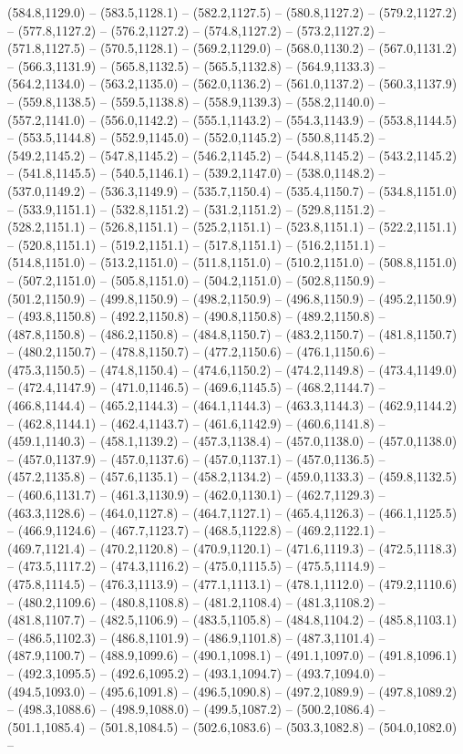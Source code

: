 (584.8,1129.0) -- (583.5,1128.1) -- (582.2,1127.5) -- (580.8,1127.2) -- (579.2,1127.2) -- (577.8,1127.2) -- (576.2,1127.2) -- (574.8,1127.2) -- (573.2,1127.2) -- (571.8,1127.5) -- (570.5,1128.1) -- (569.2,1129.0) -- (568.0,1130.2) -- (567.0,1131.2) -- (566.3,1131.9) -- (565.8,1132.5) -- (565.5,1132.8) -- (564.9,1133.3) -- (564.2,1134.0) -- (563.2,1135.0) -- (562.0,1136.2) -- (561.0,1137.2) -- (560.3,1137.9) -- (559.8,1138.5) -- (559.5,1138.8) -- (558.9,1139.3) -- (558.2,1140.0) -- (557.2,1141.0) -- (556.0,1142.2) -- (555.1,1143.2) -- (554.3,1143.9) -- (553.8,1144.5) -- (553.5,1144.8) -- (552.9,1145.0) -- (552.0,1145.2) -- (550.8,1145.2) -- (549.2,1145.2) -- (547.8,1145.2) -- (546.2,1145.2) -- (544.8,1145.2) -- (543.2,1145.2) -- (541.8,1145.5) -- (540.5,1146.1) -- (539.2,1147.0) -- (538.0,1148.2) -- (537.0,1149.2) -- (536.3,1149.9) -- (535.7,1150.4) -- (535.4,1150.7) -- (534.8,1151.0) -- (533.9,1151.1) -- (532.8,1151.2) -- (531.2,1151.2) -- (529.8,1151.2) -- (528.2,1151.1) -- (526.8,1151.1) -- (525.2,1151.1) -- (523.8,1151.1) -- (522.2,1151.1) -- (520.8,1151.1) -- (519.2,1151.1) -- (517.8,1151.1) -- (516.2,1151.1) -- (514.8,1151.0) -- (513.2,1151.0) -- (511.8,1151.0) -- (510.2,1151.0) -- (508.8,1151.0) -- (507.2,1151.0) -- (505.8,1151.0) -- (504.2,1151.0) -- (502.8,1150.9) -- (501.2,1150.9) -- (499.8,1150.9) -- (498.2,1150.9) -- (496.8,1150.9) -- (495.2,1150.9) -- (493.8,1150.8) -- (492.2,1150.8) -- (490.8,1150.8) -- (489.2,1150.8) -- (487.8,1150.8) -- (486.2,1150.8) -- (484.8,1150.7) -- (483.2,1150.7) -- (481.8,1150.7) -- (480.2,1150.7) -- (478.8,1150.7) -- (477.2,1150.6) -- (476.1,1150.6) -- (475.3,1150.5) -- (474.8,1150.4) -- (474.6,1150.2) -- (474.2,1149.8) -- (473.4,1149.0) -- (472.4,1147.9) -- (471.0,1146.5) -- (469.6,1145.5) -- (468.2,1144.7) -- (466.8,1144.4) -- (465.2,1144.3) -- (464.1,1144.3) -- (463.3,1144.3) -- (462.9,1144.2) -- (462.8,1144.1) -- (462.4,1143.7) -- (461.6,1142.9) -- (460.6,1141.8) -- (459.1,1140.3) -- (458.1,1139.2) -- (457.3,1138.4) -- (457.0,1138.0) -- (457.0,1138.0) -- (457.0,1137.9) -- (457.0,1137.6) -- (457.0,1137.1) -- (457.0,1136.5) -- (457.2,1135.8) -- (457.6,1135.1) -- (458.2,1134.2) -- (459.0,1133.3) -- (459.8,1132.5) -- (460.6,1131.7) -- (461.3,1130.9) -- (462.0,1130.1) -- (462.7,1129.3) -- (463.3,1128.6) -- (464.0,1127.8) -- (464.7,1127.1) -- (465.4,1126.3) -- (466.1,1125.5) -- (466.9,1124.6) -- (467.7,1123.7) -- (468.5,1122.8) -- (469.2,1122.1) -- (469.7,1121.4) -- (470.2,1120.8) -- (470.9,1120.1) -- (471.6,1119.3) -- (472.5,1118.3) -- (473.5,1117.2) -- (474.3,1116.2) -- (475.0,1115.5) -- (475.5,1114.9) -- (475.8,1114.5) -- (476.3,1113.9) -- (477.1,1113.1) -- (478.1,1112.0) -- (479.2,1110.6) -- (480.2,1109.6) -- (480.8,1108.8) -- (481.2,1108.4) -- (481.3,1108.2) -- (481.8,1107.7) -- (482.5,1106.9) -- (483.5,1105.8) -- (484.8,1104.2) -- (485.8,1103.1) -- (486.5,1102.3) -- (486.8,1101.9) -- (486.9,1101.8) -- (487.3,1101.4) -- (487.9,1100.7) -- (488.9,1099.6) -- (490.1,1098.1) -- (491.1,1097.0) -- (491.8,1096.1) -- (492.3,1095.5) -- (492.6,1095.2) -- (493.1,1094.7) -- (493.7,1094.0) -- (494.5,1093.0) -- (495.6,1091.8) -- (496.5,1090.8) -- (497.2,1089.9) -- (497.8,1089.2) -- (498.3,1088.6) -- (498.9,1088.0) -- (499.5,1087.2) -- (500.2,1086.4) -- (501.1,1085.4) -- (501.8,1084.5) -- (502.6,1083.6) -- (503.3,1082.8) -- (504.0,1082.0) -- 